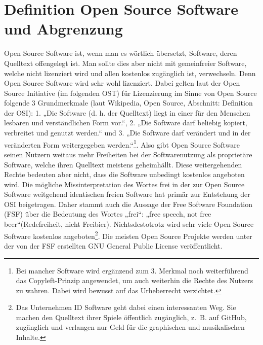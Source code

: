 \documentclass[a4paper,12pt]{article}
\begin{document}
\section{Definition Open Source Software und Abgrenzung}
Open Source Software ist, wenn man es wörtlich übersetzt, Software, deren Quelltext offengelegt ist. Man sollte dies aber nicht mit gemeinfreier Software, welche nicht lizenziert wird und allen kostenlos zugänglich ist, verwechseln. Denn Open Source Software wird sehr wohl lizenziert. Dabei gelten laut der Open Source Initiative (im folgenden OST) für Lizenzierung im Sinne von Open Source folgende 3 Grundmerkmale (laut Wikipedia, Open Source, Abschnitt: Definition der OSI): 1. „Die Software (d. h. der Quelltext) liegt in einer für den Menschen lesbaren und verständlichen Form vor.“, 2. „Die Software darf beliebig kopiert, verbreitet und genutzt werden.“ und 3. „Die Software darf verändert und in der veränderten Form weitergegeben werden.“\footnote{Bei mancher Software wird ergänzend zum 3. Merkmal noch weiterführend das Copyleft-Prinzip angewendet, um auch weiterhin die Rechte des Nutzers zu wahren. Dabei wird bewusst auf das Urheberrecht verzichtet.}. Also gibt Open Source Software seinen Nutzern weitaus mehr Freiheiten bei der Softwarenutzung als proprietäre Software, welche ihren Quelltext meistens geheimhällt. Diese weitergehenden Rechte bedeuten aber nicht, dass die Software unbedingt kostenlos angeboten wird. Die mögliche Missinterpretation des Wortes frei in der zur Open Source Software weitgehend identischen freien Software hat primär zur Entstehung der OSI beigetragen. Daher stammt auch die Aussage der Free Software Foundation (FSF) über die Bedeutung des Wortes „frei“: „free speech, not free beer“(Redefreiheit, nicht Freibier). Nichtsdestotrotz wird sehr viele Open Source Software kostenlos angeboten\footnote{Das Unternehmen ID Software geht dabei einen interessanten Weg. Sie machen den Quelltext ihrer Spiele öffentlich zugänglich, z.~B. auf GitHub, zugänglich und verlangen nur Geld für die graphischen und musikalischen Inhalte.}. Die meisten Open Source Projekte werden unter der von der FSF erstellten GNU General Public License veröffentlicht.\\
\end{document}
